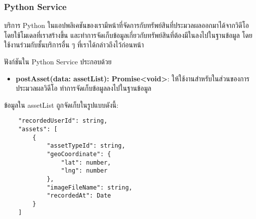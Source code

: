 \subsubsection{Python Service}

\ifenglish
\else
บริการ Python ในแอปพลิเคชันของเรามีหน้าที่จัดการกับทรัพย์สินที่ประมวลผลออกมาได้จากวิดีโอโดยใช้โมเดลที่เราสร้างขึ้น และทำการจัดเก็บข้อมูลเกี่ยวกับทรัพย์สินที่ต้องมีในลงไปในฐานข้อมูล โดยใช้งานร่วมกับชั้นบริการอื่น ๆ ที่เราได้กล่าวถึงไว้ก่อนหน้า 

ฟังก์ชันใน Python Service ประกอบด้วย

\begin{itemize}
    \item \textbf{postAsset(data: assetList): Promise<void>}: ให้ใช้งานสำหรับในส่วนของการประมวลผลวิดีโอ ทำการจัดเก็บข้อมูลลงไปในฐานข้อมูล
\end{itemize}
\fi

ข้อมูลใน assetList ถูกจัดเก็บในรูปแบบดังนี้:
\begin{lstlisting}
    "recordedUserId": string,
    "assets": [
        {
            "assetTypeId": string,
            "geoCoordinate": {
                "lat": number,
                "lng": number
            },
            "imageFileName": string,
            "recordedAt": Date
        }
    ]
\end{lstlisting}

\clearpage